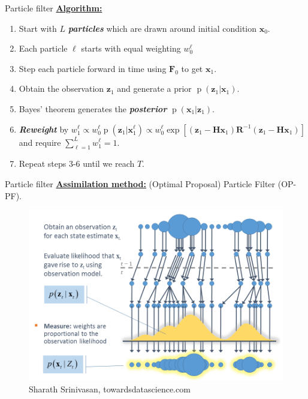 \documentclass[aspectratio=169]{beamer}
\newcommand\boldgreen[1]{\textcolor{lighter_csu_green}{\emph{\textbf{#1}}}}
\newcommand{\state}{\boldsymbol{x}}
\newcommand{\observation}{\boldsymbol{z}}
\newcommand{\obsop}{\boldsymbol{H}}
\newcommand{\observationcovariance}{\boldsymbol{R}}
\newcommand{\modelf}{\boldsymbol{F}}
\newcommand{\prob}{\operatorname{p}}
\begin{document}

\begin{frame}{Particle filter}
\vfill
\textbf{\underline{Algorithm:}}
    \begin{enumerate}[1.]
    \pause
        \item Start with $L$ \boldgreen{particles} which are drawn around initial condition $\state_0$.
    \pause
        \item Each particle $\ell$ starts with equal weighting $w^\ell_0$
    \pause
        \item Step each particle forward in time using $\modelf_0$ to get $\state_1$. 
    \pause
        \item Obtain the observation $\observation_1$ and generate a prior $\prob(\observation_1 | \state_1)$.
    \pause
        \item Bayes' theorem generates the \boldgreen{posterior} $\prob(\state_1|\observation_1)$.
    \pause
        \item \boldgreen{Reweight} by $w^\ell_{1} \propto w_{0}^\ell \prob(\observation_1 | \state_1^\ell ) \propto w_0^\ell \exp[(\observation_1 - \obsop \state_1) \observationcovariance^{-1} (\observation_1 - \obsop \state_1)]$ and require $\sum_{\ell = 1}^L w^\ell_{1} = 1.$
    \pause
        \item Repeat steps 3-6 until we reach $T$.
    \end{enumerate}
\vfill
\end{frame}



\begin{frame}{Particle filter}
    \textbf{\underline{Assimilation method:}} (Optimal Proposal) Particle Filter (OP-PF).
\begin{figure}[H]
    \centering
    \includegraphics[width=.65\textwidth]{figures/particle_filter_flowchart.png}
    \caption{Sharath Srinivasan, towardsdatascience.com}
\end{figure}
\vfill
\end{frame}
\end{document}
